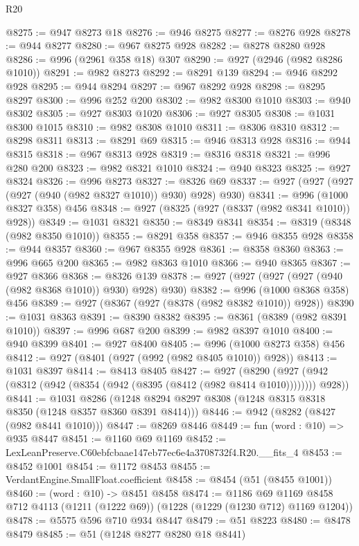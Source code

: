 \begin{lexlean}{R20}
\begin{coremodule}
@8275 := @947 @8273 @18
@8276 := @946 @8275
@8277 := @8276 @928
@8278 := @944 @8277
@8280 := @967 @8275 @928
@8282 := @8278 @8280 @928
@8286 := @996 (@2961 @358 @18) @307
@8290 := @927 (@2946 (@982 @8286 @1010))
@8291 := @982 @8273
@8292 := @8291 @139
@8294 := @946 @8292 @928
@8295 := @944 @8294
@8297 := @967 @8292 @928
@8298 := @8295 @8297
@8300 := @996 @252 @200
@8302 := @982 @8300 @1010
@8303 := @940 @8302
@8305 := @927 @8303 @1020
@8306 := @927 @8305
@8308 := @1031 @8300 @1015
@8310 := @982 @8308 @1010
@8311 := @8306 @8310
@8312 := @8298 @8311
@8313 := @8291 @69
@8315 := @946 @8313 @928
@8316 := @944 @8315
@8318 := @967 @8313 @928
@8319 := @8316 @8318
@8321 := @996 @280 @200
@8323 := @982 @8321 @1010
@8324 := @940 @8323
@8325 := @927 @8324
@8326 := @996 @8273
@8327 := @8326 @69
@8337 := @927 (@927 (@927 (@927 (@940 (@982 @8327 @1010)) @930) @928) @930)
@8341 := @996 (@1000 @8327 @358) @456
@8348 := @927 (@8325 (@927 (@8337 (@982 @8341 @1010)) @928))
@8349 := @1031 @8321
@8350 := @8349 @8341
@8354 := @8319 (@8348 (@982 @8350 @1010))
@8355 := @8291 @358
@8357 := @946 @8355 @928
@8358 := @944 @8357
@8360 := @967 @8355 @928
@8361 := @8358 @8360
@8363 := @996 @665 @200
@8365 := @982 @8363 @1010
@8366 := @940 @8365
@8367 := @927 @8366
@8368 := @8326 @139
@8378 := @927 (@927 (@927 (@927 (@940 (@982 @8368 @1010)) @930) @928) @930)
@8382 := @996 (@1000 @8368 @358) @456
@8389 := @927 (@8367 (@927 (@8378 (@982 @8382 @1010)) @928))
@8390 := @1031 @8363
@8391 := @8390 @8382
@8395 := @8361 (@8389 (@982 @8391 @1010))
@8397 := @996 @687 @200
@8399 := @982 @8397 @1010
@8400 := @940 @8399
@8401 := @927 @8400
@8405 := @996 (@1000 @8273 @358) @456
@8412 := @927 (@8401 (@927 (@992 (@982 @8405 @1010)) @928))
@8413 := @1031 @8397
@8414 := @8413 @8405
@8427 := @927
    (@8290 (@927 (@942 (@8312 (@942 (@8354 (@942 (@8395 (@8412 (@982 @8414 @1010)))))))) @928))
@8441 := @1031
    @8286
    (@1248 @8294 @8297 @8308 (@1248 @8315 @8318 @8350 (@1248 @8357 @8360 @8391 @8414)))
@8446 := @942 (@8282 (@8427 (@982 @8441 @1010)))
@8447 := @8269 @8446
@8449 := fun (word : @10) => @935 @8447
@8451 := @1160 @69 @1169
@8452 := LexLeanPreserve.C60ebfcbaae147eb77ec6e4a3708732f4.R20.__fits_4
@8453 := @8452 @1001
@8454 := @1172 @8453
@8455 := VerdantEngine.SmallFloat.coefficient
@8458 := @8454 (@51 (@8455 @1001))
@8460 := (word : @10) -> @8451 @8458
@8474 := @1186
    @69
    @1169
    @8458
    @712
    @4113
    (@1211 (@1222 @69))
    (@1228 (@1229 (@1230 @712) @1169 @1204))
@8478 := @5575 @596 @710 @934 @8447
@8479 := @51 @8223
@8480 := @8478 @8479
@8485 := @51 (@1248 @8277 @8280 @18 @8441)

\end{coremodule}
\end{lexlean}
